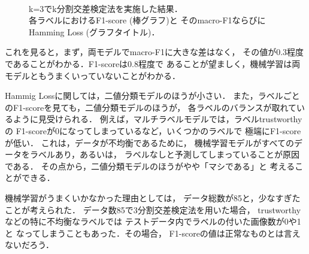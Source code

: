 \begin{figure}[!t]
  \centering
  \\
  \caption{ k=3でk分割交差検定法を実施した結果．\\
    各ラベルにおけるF1-score (棒グラフ)と
  そのmacro-F1ならびにHamming Loss (グラフタイトル)．
 }
  \label{fig:ch2:result}
\end{figure}

これを見ると，まず，両モデルでmacro-F1に大きな差はなく，
その値が0.3程度であることがわかる．F1-scoreは0.8程度で
あることが望ましく，機械学習は両モデルともうまくいっていないことがわかる．

Hammig Lossに関しては，二値分類モデルのほうが小さい．
また，ラベルごとのF1-scoreを見ても，二値分類モデルのほうが，
各ラベルのバランスが取れているように見受けられる．
例えば，マルチラベルモデルでは，ラベルtrustworthyの
F1-scoreが0になってしまっているなど，いくつかのラベルで
極端にF1-scoreが低い．
これは，データが不均衡であるために，
機械学習モデルがすべてのデータをラベルあり，あるいは，
ラベルなしと予測してしまっていることが原因である．
その点から，二値分類モデルのほうがやや「マシである」と
考えることができる．

機械学習がうまくいかなかった理由としては，
データ総数が85と，少なすぎたことが考えられた．
データ数85で3分割交差検定法を用いた場合，
trustworthyなどの特に不均衡なラベルでは
テストデータ内でラベルの付いた画像数が0や1と
なってしまうこともあった．その場合，
F1-scoreの値は正常なものとは言えないだろう．

